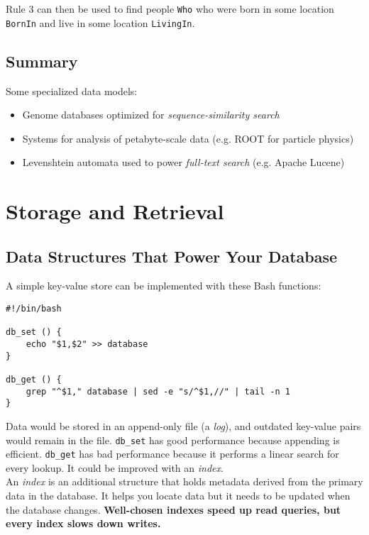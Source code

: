 \documentclass[12pt, titlepage]{article}
\begin{document}
Rule 3 can then be used to find people \texttt{Who} who were born in some location \texttt{BornIn} and live in some location \texttt{LivingIn}.

\subsection{Summary}

Some specialized data models:

\begin{itemize}
    \item Genome databases optimized for \textit{sequence-similarity search}
    \item Systems for analysis of petabyte-scale data (e.g. ROOT for particle physics)
    \item Levenshtein automata used to power \textit{full-text search} (e.g. Apache Lucene)
\end{itemize}

\section{Storage and Retrieval}

\subsection{Data Structures That Power Your Database}

A simple key-value store can be implemented with these Bash functions:

\begin{verbatim}
#!/bin/bash

db_set () {
    echo "$1,$2" >> database
}

db_get () {
    grep "^$1," database | sed -e "s/^$1,//" | tail -n 1
}
\end{verbatim}

Data would be stored in an append-only file (a \textit{log}), and outdated key-value pairs would remain in the file. \texttt{db\_set} has good performance because appending is efficient. \texttt{db\_get} has bad performance because it performs a linear search for every lookup. It could be improved with an \textit{index}. \\

An \textit{index} is an additional structure that holds metadata derived from the primary data in the database. It helps you locate data but it needs to be updated when the database changes. \textbf{Well-chosen indexes speed up read queries, but every index slows down writes.} \\
\end{document}
